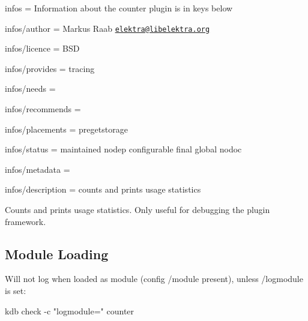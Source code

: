 
\begin{DoxyItemize}
\item infos = Information about the counter plugin is in keys below
\item infos/author = Markus Raab \href{mailto:elektra@libelektra.org}{\tt elektra@libelektra.\+org}
\item infos/licence = B\+SD
\item infos/provides = tracing
\item infos/needs =
\item infos/recommends =
\item infos/placements = pregetstorage
\item infos/status = maintained nodep configurable final global nodoc
\item infos/metadata =
\item infos/description = counts and prints usage statistics
\end{DoxyItemize}

Counts and prints usage statistics. Only useful for debugging the plugin framework.

\subsection*{Module Loading}

Will not log when loaded as module (config {\ttfamily /module} present), unless {\ttfamily /logmodule} is set\+:


\begin{DoxyCode}
kdb check -c "logmodule=" counter
\end{DoxyCode}
 